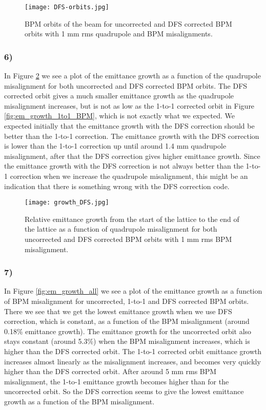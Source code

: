 \documentclass[12pt,a4paper,english]{article}
\begin{document}
\begin{figure}[htbp!]
	\centering\texttt{[image: DFS-orbits.jpg]}
	\caption{BPM orbits of the beam for uncorrected and DFS corrected BPM orbits with 1 mm rms quadrupole and BPM misalignments. \label{fig:DFS_orbit}}
\end{figure} 

\subsubsection*{6)}
In Figure \ref{fig:em_growth_DFS} we see a plot of the emittance growth as a function of the quadrupole misalignment for both uncorrected and DFS corrected BPM orbits. The DFS corrected orbit gives a much smaller emittance growth as the quadrupole misalignment increases, but is not as low as the 1-to-1 corrected orbit in Figure \ref{fig:em_growth_1to1_BPM}, which is not exactly what we expected. We expected initially that the emittance growth with the DFS correction should be better than the 1-to-1 correction. The emittance growth with the DFS correction is lower than the 1-to-1 correction up until around 1.4 mm quadrupole misalignment, after that the DFS correction gives higher emittance growth. Since the emittance growth with the DFS correction is not always better than the 1-to-1 correction when we increase the quadrupole misalignment, this might be an indication that there is something wrong with the DFS correction code.

\begin{figure}[t!]
	\centering\texttt{[image: growth\_DFS.jpg]}
	\caption{Relative emittance growth from the start of the lattice to the end of the lattice as a function of quadrupole misalignment for both uncorrected and DFS corrected BPM orbits with 1 mm rms BPM misalignment. \label{fig:em_growth_DFS}}
\end{figure} 
\newpage
\subsubsection*{7)}
In Figure \ref{fig:em_growth_all} we see a plot of the emittance growth as a function of BPM misalignment for uncorrected, 1-to-1 and DFS corrected BPM orbits. There we see that we get the lowest emittance growth when we use DFS correction, which is constant, as a function of the BPM misalignment (around 0.18\% emittance growth). The emittance growth for the uncorrected orbit also stays constant (around 5.3\%) when the BPM misalignment increases, which is higher than the DFS corrected orbit. The 1-to-1 corrected orbit emittance growth increases almost linearly as the misalignment increases, and becomes very quickly higher than the DFS corrected orbit. After around 5 mm rms BPM misalignment, the 1-to-1 emittance growth becomes higher than for the uncorrected orbit. So the DFS correction seems to give the lowest emittance growth as a function of the BPM misalignment.
\end{document}
